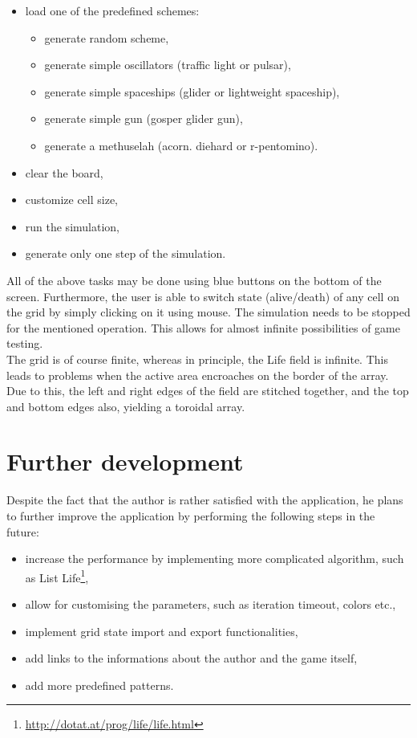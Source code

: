 \documentclass[11pt,a4paper]{article}
\begin{document}
\begin{itemize}
  \item load one of the predefined schemes:
  \begin{itemize}
    \item generate random scheme,
    \item generate simple oscillators (traffic light or pulsar),
    \item generate simple spaceships (glider or lightweight spaceship),
    \item generate simple gun (gosper glider gun),
    \item generate a methuselah (acorn. diehard or r-pentomino).
  \end{itemize}
  \item clear the board,
  \item customize cell size,
  \item run the simulation,
  \item generate only one step of the simulation.
\end{itemize}

All of the above tasks may be done using blue buttons on the bottom of the screen. Furthermore, the user is able to switch state (alive/death) of any cell on the grid by simply clicking on it using mouse. The simulation needs to be stopped for the mentioned operation. This allows for almost infinite possibilities of game testing.\\

The grid is of course finite, whereas in principle, the Life field is infinite. This leads to problems when the active area encroaches on the border of the array. Due to this, the left and right edges of the field are stitched together, and the top and bottom edges also, yielding a toroidal array.

\newpage
\section{Further development}
Despite the fact that the author is rather satisfied with the application, he plans to further improve the application by performing the following steps in the future:

\begin{itemize}
  \item increase the performance by implementing more complicated algorithm, such as List Life\footnote{\url{http://dotat.at/prog/life/life.html}},
  \item allow for customising the parameters, such as iteration timeout, colors etc.,
  \item implement grid state import and export functionalities,
  \item add links to the informations about the author and the game itself,
  \item add more predefined patterns.
\end{itemize}
\end{document}
